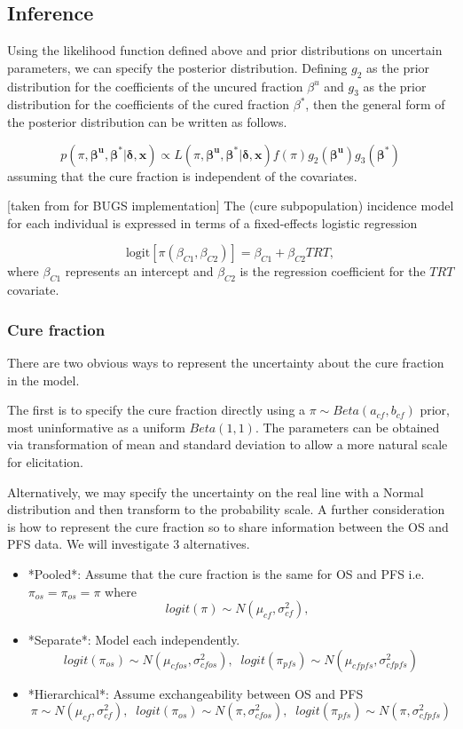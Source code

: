 \documentclass[AMA,STIX1COL]{WileyNJD-v2}
\begin{document}
\subsection{Inference}
Using the likelihood function defined above and prior distributions on
uncertain parameters, we can specify the posterior distribution.
Defining $g_2$ as the prior distribution for the coefficients of the
uncured fraction $\beta^u$ and $g_3$ as the prior distribution for the
coefficients of the cured fraction $\beta^*$, then the general form of
the posterior distribution can be written as follows.

$$
p(\pi, \boldsymbol{\beta^u}, \boldsymbol{\beta^*} | \boldsymbol{\delta}, \boldsymbol{x}) \propto
L(\pi, \boldsymbol{\beta^u}, \boldsymbol{\beta^*} | \boldsymbol{\delta}, \boldsymbol{x}) f(\pi) g_2(\boldsymbol{\beta^u}) g_3(\boldsymbol{\beta^*})
$$
assuming that the cure fraction is independent of the covariates.

[taken from \cite{Alvares2020} for BUGS implementation]
The (cure subpopulation) incidence model for each individual is expressed in terms of a fixed-effects logistic regression

$$
\text{logit}[\pi (\beta_{C1}, \beta_{C2})] = \beta_{C1} + \beta_{C2} TRT,
$$
where $\beta_{C1}$ represents an intercept and $\beta_{C2}$ is the regression coefficient for the $TRT$ covariate.

\subsubsection{Cure fraction}
There are two obvious ways to represent the uncertainty about the cure
fraction in the model.

The first is to specify the cure fraction directly using a
$\pi \sim Beta(a_{cf}, b_{cf})$ prior, most uninformative as a uniform
$Beta(1,1)$. The parameters can be obtained via transformation of mean
and standard deviation to allow a more natural scale for elicitation.

Alternatively, we may specify the uncertainty on the real line with a
Normal distribution and then transform to the probability scale.
A further consideration is how to represent the cure fraction so to
share information between the OS and PFS data. We will investigate 3
alternatives.

\begin{itemize}
    \item *Pooled*: Assume that the cure fraction is the same for OS and PFS
    i.e. $\pi_{os} = \pi_{os} = \pi$ where $$
    logit(\pi) \sim N(\mu_{cf}, \sigma_{cf}^2), \;\;
    $$
    \item *Separate*: Model each independently. $$
    logit(\pi_{os}) \sim N(\mu_{cfos}, \sigma_{cfos}^2), \;\;  
    logit(\pi_{pfs}) \sim N(\mu_{cfpfs}, \sigma_{cfpfs}^2)  
    $$
    \item *Hierarchical*: Assume exchangeability between OS and PFS$$
    \pi \sim N(\mu_{cf}, \sigma_{cf}^2), \;\;  
    logit(\pi_{os}) \sim N(\pi, \sigma_{cfos}^2), \;\;  
    logit(\pi_{pfs}) \sim N(\pi, \sigma_{cfpfs}^2)  
    $$
\end{itemize}
\end{document}
